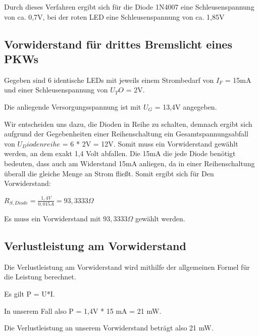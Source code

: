 \documentclass[
a4paper,     %
 headsepline, %
11pt         %
]{scrartcl}  %
\begin{document}
Durch dieses Verfahren ergibt sich für die Diode 1N4007 eine Schleusenspannung von ca. 0,7V, bei der roten LED eine Schleusenspannung von ca. 1,85V

\subsection{Vorwiderstand für drittes Bremslicht eines PKWs}

Gegeben sind 6 identische LEDs mit jeweils einem Strombedarf von $I_F$ = 15mA und einer Schleusenspannung von $U_TO$ = 2V.

Die anliegende Versorgungsspannung ist mit $U_G$ = 13,4V angegeben.

Wir entscheiden uns dazu, die Dioden in Reihe zu schalten, demnach ergibt sich aufgrund der Gegebenheiten einer Reihenschaltung ein Gesamtspannungsabfall von $U_Diodenreihe$ = 6 * 2V = 12V. Somit muss ein Vorwiderstand gewählt werden, an dem exakt 1,4 Volt abfallen. Die 15mA die jede Diode benötigt bedeuten, dass auch am Widerstand 15mA anliegen, da in einer Reihenschaltung überall die gleiche Menge an Strom fließt. Somit ergibt sich für Den Vorwiderstand:

$R_{S,Diode}=\frac{1,4V}{0,015A}=93,3333\Omega$

Es muss ein Vorwiderstand mit $93,3333\Omega$ gewählt werden.

\subsection{Verlustleistung am Vorwiderstand}

Die Verlustleistung am Vorwiderstand wird mithilfe der allgemeinen Formel für die Leistung berechnet.

Es gilt P = U*I.

In unserem Fall also P = 1,4V * 15 mA = 21 mW.

Die Verlustleistung an unserem Vorwiderstand beträgt also 21 mW.



% 

% 
\end{document}
